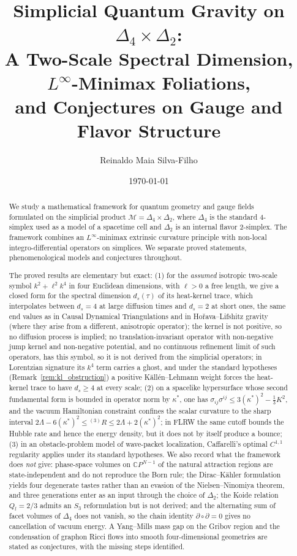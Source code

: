 \documentclass[11pt,a4paper,reqno]{amsart}
\title[Simplicial Quantum Gravity on $\Delta_4 \times \Delta_2$]{Simplicial Quantum Gravity on $\Delta_4 \times \Delta_2$:\\ A Two-Scale Spectral Dimension, $L^\infty$-Minimax Foliations,\\ and Conjectures on Gauge and Flavor Structure}
\author{Reinaldo Maia Silva-Filho}
\date{\today}
\theoremstyle{definition}
\numberwithin{equation}{section}
\begin{document}
\begin{abstract}
We study a mathematical framework for quantum geometry and gauge fields formulated on the simplicial product $\mathcal{M} = \Delta_4 \times \Delta_2$, where $\Delta_4$ is the standard 4-simplex used as a model of a spacetime cell and $\Delta_2$ is an internal flavor 2-simplex. The framework combines an $L^\infty$-minimax extrinsic curvature principle with non-local integro-differential operators on simplices. We separate proved statements, phenomenological models and conjectures throughout.

The proved results are elementary but exact:
(1) for the \emph{assumed} isotropic two-scale symbol $k^2 + \ell^2 k^4$ in four Euclidean dimensions, with $\ell > 0$ a free length, we give a closed form for the spectral dimension $d_s(\tau)$ of its heat-kernel trace, which interpolates between $d_s = 4$ at large diffusion times and $d_s = 2$ at short ones, the same end values as in Causal Dynamical Triangulations and in Ho\v{r}ava--Lifshitz gravity (where they arise from a different, anisotropic operator); the kernel is not positive, so no diffusion process is implied; no translation-invariant operator with non-negative jump kernel and non-negative potential, and no continuous refinement limit of such operators, has this symbol, so it is not derived from the simplicial operators; in Lorentzian signature its $k^4$ term carries a ghost, and under the standard hypotheses (Remark~\ref{rem:kl_obstruction}) a positive K\"all\'en--Lehmann weight forces the heat-kernel trace to have $d_s \ge 4$ at every scale;
(2) on a spacelike hypersurface whose second fundamental form is bounded in operator norm by $\kappa^*$, one has $\sigma_{ij}\sigma^{ij} \le 3(\kappa^*)^2 - \frac{1}{3}K^2$, and the vacuum Hamiltonian constraint confines the scalar curvature to the sharp interval $2\Lambda - 6(\kappa^*)^2 \le {}^{(3)}R \le 2\Lambda + 2(\kappa^*)^2$; in FLRW the same cutoff bounds the Hubble rate and hence the energy density, but it does not by itself produce a bounce;
(3) in an obstacle-problem model of wave-packet localization, Caffarelli's optimal $C^{1,1}$ regularity applies under its standard hypotheses.
We also record what the framework does \emph{not} give: phase-space volumes on $\mathbb{C}P^{N-1}$ of the natural attraction regions are state-independent and do not reproduce the Born rule; the Dirac--K\"ahler formulation yields four degenerate tastes rather than an evasion of the Nielsen--Ninomiya theorem, and three generations enter as an input through the choice of $\Delta_2$; the Koide relation $Q_l = 2/3$ admits an $S_3$ reformulation but is not derived; and the alternating sum of facet volumes of $\Delta_4$ does not vanish, so the chain identity $\partial \circ \partial = 0$ gives no cancellation of vacuum energy. A Yang--Mills mass gap on the Gribov region and the condensation of graphon Ricci flows into smooth four-dimensional geometries are stated as conjectures, with the missing steps identified.


\end{abstract}
\end{document}
